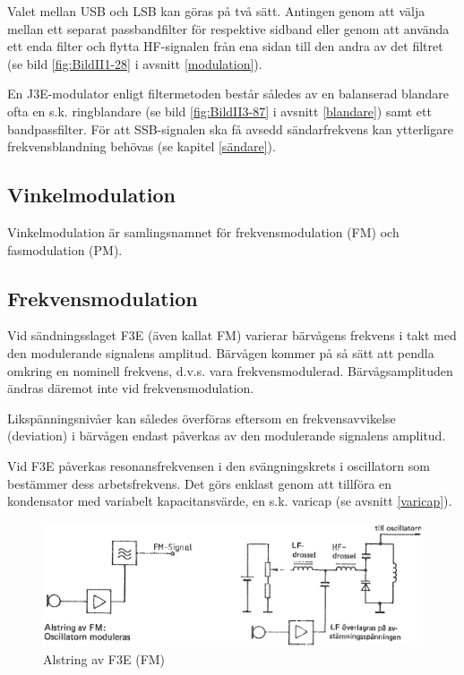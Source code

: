 Valet mellan USB och LSB kan göras på två sätt. Antingen genom att
välja mellan ett separat passbandfilter för respektive sidband eller
genom att använda ett enda filter och flytta HF-signalen från ena
sidan till den andra av det filtret (se bild \ref{fig:BildII1-28} i
avsnitt \ref{modulation}).

En J3E-modulator enligt filtermetoden består således av en balanserad
blandare ofta en s.k. ringblandare (se bild \ref{fig:BildII3-87} i avsnitt
\ref{blandare}) samt ett bandpassfilter.  För att SSB-signalen ska få avsedd
sändarfrekvens kan ytterligare frekvensblandning behövas (se kapitel
\ref{sändare}).

\subsection{Vinkelmodulation}

Vinkelmodulation är samlingsnamnet för frekvensmodulation (FM) och
fasmodulation (PM).

\subsection{Frekvensmodulation}

Vid sändningsslaget F3E (även kallat FM) varierar bärvågens frekvens i
takt med den modulerande signalens amplitud. Bärvågen kommer på så
sätt att pendla omkring en nominell frekvens, d.v.s. vara
frekvensmodulerad. Bärvågsamplituden ändras däremot inte vid
frekvensmodulation.

Likspänningsnivåer kan således överföras eftersom en frekvensavvikelse
(deviation) i bärvågen endast påverkas av den modulerande signalens
amplitud.

Vid F3E påverkas resonansfrekvensen i den svängningskrets i
oscillatorn som bestämmer dess arbetsfrekvens. Det görs enklast genom
att tillföra en kondensator med variabelt kapacitansvärde, en
s.k. varicap (se avsnitt \ref{varicap}).

\begin{figure}
\includegraphics[width=\textwidth]{images/bild_2_3-91.png}
\caption{Alstring av F3E (FM)}
\label{fig:BildII3-91}
\end{figure}

